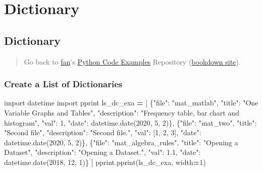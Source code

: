 \documentclass[
]{book}
\newenvironment{Shaded}{\begin{snugshade}}{\end{snugshade}}
\newcommand{\DecValTok}[1]{\textcolor[rgb]{0.00,0.00,0.81}{#1}}
\newcommand{\FloatTok}[1]{\textcolor[rgb]{0.00,0.00,0.81}{#1}}
\newcommand{\ImportTok}[1]{#1}
\newcommand{\NormalTok}[1]{#1}
\newcommand{\OperatorTok}[1]{\textcolor[rgb]{0.81,0.36,0.00}{\textbf{#1}}}
\newcommand{\StringTok}[1]{\textcolor[rgb]{0.31,0.60,0.02}{#1}}
\begin{document}
\hypertarget{dictionary}{%
\section{Dictionary}\label{dictionary}}

\hypertarget{dictionary-1}{%
\subsection{Dictionary}\label{dictionary-1}}

\begin{quote}
Go back to \href{http://fanwangecon.github.io/}{fan}'s \href{https://fanwangecon.github.io/pyfan/}{Python Code Examples} Repository (\href{https://fanwangecon.github.io/pyfan/bookdown}{bookdown site}).
\end{quote}

\hypertarget{create-a-list-of-dictionaries}{%
\subsubsection{Create a List of Dictionaries}\label{create-a-list-of-dictionaries}}

\begin{Shaded}
\begin{Highlighting}[]
\ImportTok{import}\NormalTok{ datetime}
\ImportTok{import}\NormalTok{ pprint}
\NormalTok{ls\_dc\_exa }\OperatorTok{=}\NormalTok{  [}
\NormalTok{    \{}\StringTok{"file"}\NormalTok{: }\StringTok{"mat\_matlab"}\NormalTok{,}
     \StringTok{"title"}\NormalTok{: }\StringTok{"One Variable Graphs and Tables"}\NormalTok{,}
     \StringTok{"description"}\NormalTok{: }\StringTok{"Frequency table, bar chart and histogram"}\NormalTok{,}
     \StringTok{"val"}\NormalTok{: }\DecValTok{1}\NormalTok{,}
     \StringTok{"date"}\NormalTok{: datetime.date(}\DecValTok{2020}\NormalTok{, }\DecValTok{5}\NormalTok{, }\DecValTok{2}\NormalTok{)\},}
\NormalTok{    \{}\StringTok{"file"}\NormalTok{: }\StringTok{"mat\_two"}\NormalTok{,}
     \StringTok{"title"}\NormalTok{: }\StringTok{"Second file"}\NormalTok{,}
     \StringTok{"description"}\NormalTok{: }\StringTok{"Second file."}\NormalTok{,}
     \StringTok{"val"}\NormalTok{: [}\DecValTok{1}\NormalTok{, }\DecValTok{2}\NormalTok{, }\DecValTok{3}\NormalTok{],}
     \StringTok{"date"}\NormalTok{: datetime.date(}\DecValTok{2020}\NormalTok{, }\DecValTok{5}\NormalTok{, }\DecValTok{2}\NormalTok{)\},}
\NormalTok{    \{}\StringTok{"file"}\NormalTok{: }\StringTok{"mat\_algebra\_rules"}\NormalTok{,}
     \StringTok{"title"}\NormalTok{: }\StringTok{"Opening a Dataset"}\NormalTok{,}
     \StringTok{"description"}\NormalTok{: }\StringTok{"Opening a Dataset."}\NormalTok{,}
     \StringTok{"val"}\NormalTok{: }\FloatTok{1.1}\NormalTok{,}
     \StringTok{"date"}\NormalTok{: datetime.date(}\DecValTok{2018}\NormalTok{, }\DecValTok{12}\NormalTok{, }\DecValTok{1}\NormalTok{)\}}
\NormalTok{]}
\NormalTok{pprint.pprint(ls\_dc\_exa, width}\OperatorTok{=}\DecValTok{1}\NormalTok{)}
\end{Highlighting}
\end{Shaded}
\end{document}
